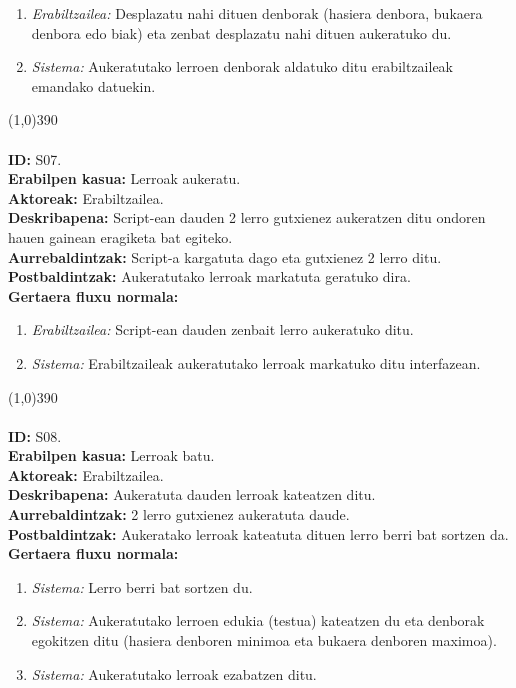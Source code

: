 \begin{enumerate}
	\item \textit{Erabiltzailea:} Desplazatu nahi dituen denborak (hasiera denbora, bukaera denbora edo biak) eta zenbat desplazatu nahi dituen aukeratuko du.
	\item \textit{Sistema:} Aukeratutako lerroen denborak aldatuko ditu erabiltzaileak emandako datuekin.
\end{enumerate}
\line(1,0){390}\\
\noindent\\
\textbf{ID:} S07.\\
\textbf{Erabilpen kasua:} Lerroak aukeratu.\\
\textbf{Aktoreak:} Erabiltzailea.\\
\textbf{Deskribapena:} Script-ean dauden 2 lerro gutxienez aukeratzen ditu ondoren hauen gainean eragiketa bat egiteko.\\
\textbf{Aurrebaldintzak:} Script-a kargatuta dago eta gutxienez 2 lerro ditu.\\
\textbf{Postbaldintzak:} Aukeratutako lerroak markatuta geratuko dira.\\
\textbf{Gertaera fluxu normala:}
\begin{enumerate}
	\item \textit{Erabiltzailea:} Script-ean dauden zenbait lerro aukeratuko ditu.
	\item \textit{Sistema:} Erabiltzaileak aukeratutako lerroak markatuko ditu interfazean.
\end{enumerate}
\line(1,0){390}\\
\noindent\\
\textbf{ID:} S08.\\
\textbf{Erabilpen kasua:} Lerroak batu.\\
\textbf{Aktoreak:} Erabiltzailea.\\
\textbf{Deskribapena:} Aukeratuta dauden lerroak kateatzen ditu.\\
\textbf{Aurrebaldintzak:} 2 lerro gutxienez aukeratuta daude.\\
\textbf{Postbaldintzak:} Aukeratako lerroak kateatuta dituen lerro berri bat sortzen da.\\
\textbf{Gertaera fluxu normala:}
\begin{enumerate}
	\item \textit{Sistema:} Lerro berri bat sortzen du.
	\item \textit{Sistema:} Aukeratutako lerroen edukia (testua) kateatzen du eta denborak egokitzen ditu (hasiera denboren minimoa eta bukaera denboren maximoa).
	\item \textit{Sistema:} Aukeratutako lerroak ezabatzen ditu.
\end{enumerate}
